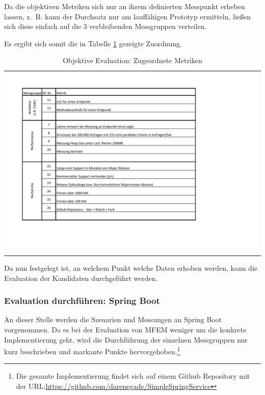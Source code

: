 Da die objektiven Metriken sich nur an ihrem definierten Messpunkt erheben lassen, z.~B. kann der Durchsatz nur am lauffähigen Prototyp ermitteln, ließen sich diese einfach auf die 3 verbleibenden Messgruppen verteilen. 

Es ergibt sich somit die in Tabelle \ref{ObjekEvalMetriken} gezeigte Zuordnung. 

\begin{longtable}{c}
	\includegraphics[width=\linewidth]{Bilder/ObjekEvalMetriken.pdf} \\	
	\caption[Metriken Objektive Evaluation]{Objektive Evaluation: Zugeordnete Metriken}
	\label{ObjekEvalMetriken}\\
\end{longtable}
\FloatBarrier

Da nun festgelegt ist, an welchem Punkt welche Daten erhoben werden, kann die Evaluation der Kandidaten durchgeführt werden.

\subsubsection{Evaluation durchführen: Spring Boot}

An dieser Stelle werden die Szenarien und Messungen an Spring Boot vorgenommen. Da es bei der Evaluation von \ac{MFEM} weniger um die konkrete Implementierung geht, wird die Durchführung der einzelnen Messgruppen nur kurz beschrieben und markante Punkte hervorgehoben.\footnote{
	Die gesamte Implementierung findet sich auf einem Github Repository mit der URL:\url{https://github.com/darenegade/SimpleSpringService}
}  


